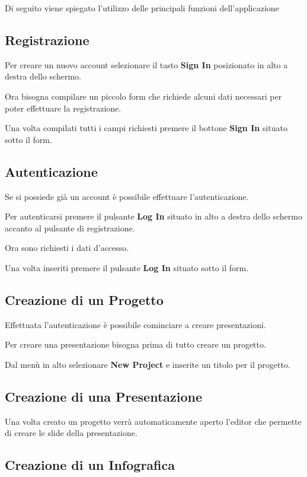 Di seguito viene spiegato l'utilizzo delle principali funzioni dell'applicazione
\subsection{Registrazione}
Per creare un nuovo account selezionare il tasto \textbf{Sign In} posizionato in alto a destra dello schermo.

\noindent Ora bisogna compilare un piccolo form che richiede alcuni dati necessari per poter effettuare la registrazione.


\noindent Una volta compilati tutti i campi richiesti premere il bottone \textbf{Sign In} situato sotto il form.

\subsection{Autenticazione}
Se si possiede già un account è possibile effettuare l'autenticazione.

\noindent Per autenticarsi premere il pulsante \textbf{Log In} situato in alto a destra dello schermo accanto al pulsante di registrazione.

\noindent Ora sono richiesti i dati d'accesso.

\noindent Una volta inseriti premere il pulsante \textbf{Log In} situato sotto il form.

\subsection{Creazione di un Progetto}

Effettuata l'autenticazione è possibile cominciare a creare presentazioni.

\noindent Per creare una presentazione bisogna prima di tutto creare un progetto.

\noindent Dal menù in alto selezionare \textbf{New Project} e inserite un titolo per il progetto.



\subsection{Creazione di una Presentazione}

Una volta creato un progetto verrà automaticamente aperto l'editor che permette di creare le slide della presentazione.

\subsection{Creazione di un Infografica}

